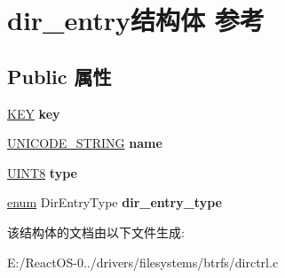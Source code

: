 \hypertarget{structdir__entry}{}\section{dir\+\_\+entry结构体 参考}
\label{structdir__entry}
\subsection*{Public 属性}
\begin{DoxyCompactItemize}
\item 
\mbox{\label{structdir__entry_a7485d1859e94a99348f70b8477d50548}} 
\hyperlink{struct_k_e_y}{K\+EY} {\bfseries key}
\item 
\mbox{\label{structdir__entry_af25d73a15aaaf26aaacaa1d8d77950e8}} 
\hyperlink{struct___u_n_i_c_o_d_e___s_t_r_i_n_g}{U\+N\+I\+C\+O\+D\+E\+\_\+\+S\+T\+R\+I\+NG} {\bfseries name}
\item 
\mbox{\label{structdir__entry_a8c5ce671e01c9196ca5be11f981c8cad}} 
\hyperlink{_processor_bind_8h_ab27e9918b538ce9d8ca692479b375b6a}{U\+I\+N\+T8} {\bfseries type}
\item 
\mbox{\label{structdir__entry_a5540d88c1de521befd02495d5ca5f36d}} 
\hyperlink{interfaceenum}{enum} Dir\+Entry\+Type {\bfseries dir\+\_\+entry\+\_\+type}
\end{DoxyCompactItemize}


该结构体的文档由以下文件生成\+:\begin{DoxyCompactItemize}
\item 
E\+:/\+React\+O\+S-\/0../drivers/filesystems/btrfs/dirctrl.\+c\end{DoxyCompactItemize}
